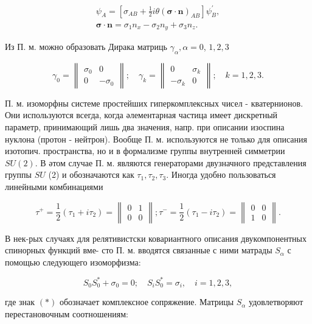 \documentclass[10pt]{article}
\begin{document}
\[
\begin{gathered}
\psi_{A}=\left[\sigma_{A B}+\frac{1}{2} i \theta(\boldsymbol{\sigma} \cdot \boldsymbol{n})_{A B}\right] \psi_{B}^{\prime}, \\
\boldsymbol{\sigma} \cdot \boldsymbol{n}=\sigma_{1} n_{x}-\sigma_{2} n_{y}+\sigma_{3} n_{z} .
\end{gathered}
\]

Из П. м. можно образовать Дирака матриць $\gamma_{\alpha}, \alpha=0$, $1,2,3$

\[
\gamma_{0}=\left\|\begin{array}{ll}
\sigma_{0} & 0 \\
0 & -\sigma_{0}
\end{array}\right\| ; \quad \gamma_{k}=\left\|\begin{array}{cc}
0 & \sigma_{k} \\
-\sigma_{k} & 0
\end{array}\right\| ; \quad k=1,2,3 .
\]

П. м. изоморфны системе простейших гиперкомплексных чисел - кватернионов. Они используются всегда, когда әлементарная частица имеет дискретный параметр, принимающий лишь два значения, напр. при описании изоспина нуклона (протон - нейтрон). Вообще П. м. используются не только для описания изотопич. пространства, но и в формализме группы внутренней симметрии $S U(2)$. В әтом случае П. м. являются генераторами двузначного представления группы $S U$ (2) и обозначаются как $\tau_{1}, \tau_{2}, \tau_{3}$. Иногда удобно пользоваться линейными комбинациями

\[
\tau^{+}=\frac{1}{2}\left(\tau_{1}+i \tau_{2}\right)=\left\|\begin{array}{ll}
0 & 1 \\
0 & 0
\end{array}\right\| ; \tau^{-}=\frac{1}{2}\left(\tau_{1}-i \tau_{2}\right)=\left\|\begin{array}{ll}
0 & 0 \\
1 & 0
\end{array}\right\| .
\]

В нек-рых случаях для релятивистски ковариантного описания двукомпонентных спинорных функций вме- сто П. м. вводятся связанные с ними матрады $S_{\alpha}$ с помощью следующего изоморфизма:

\[
S_{0} S_{0}^{*}+\sigma_{0}=0 ; \quad S_{i} S_{0}^{*}=\sigma_{i}, \quad i=1,2,3,
\]

где знак $(*)$ обозначает комплексное сопряжение. Матрицы $S_{\alpha}$ удовлетворяют перестановочным соотношениям:
\end{document}
